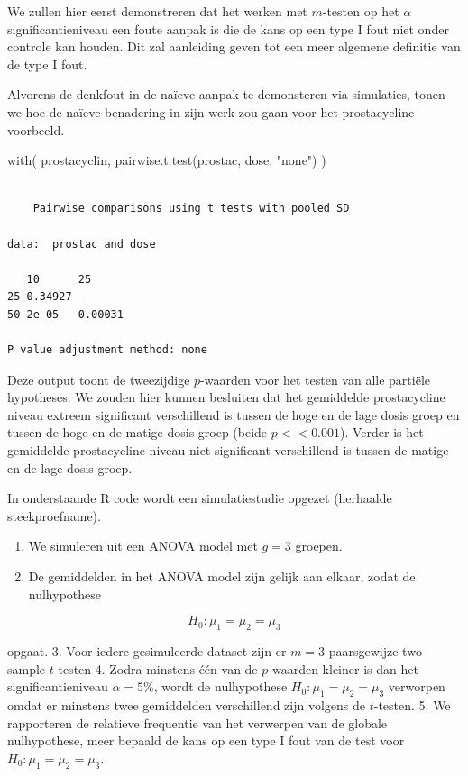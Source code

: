 \documentclass[
  dutch,
  letterpaper,
  12pt]{book}
\newenvironment{Shaded}{\begin{snugshade}}{\end{snugshade}}
\newcommand{\FunctionTok}[1]{\textcolor[rgb]{0.28,0.35,0.67}{#1}}
\newcommand{\NormalTok}[1]{\textcolor[rgb]{0.00,0.23,0.31}{#1}}
\newcommand{\StringTok}[1]{\textcolor[rgb]{0.13,0.47,0.30}{#1}}
\newcounter{none} %
\providecommand{\tightlist}{%
  \setlength{\itemsep}{0pt}\setlength{\parskip}{0pt}}
\theoremstyle{definition}
\theoremstyle{definition}
\theoremstyle{definition}
\theoremstyle{remark}
\begin{document}
We zullen hier eerst demonstreren dat het werken met \(m\)-testen op het
\(\alpha\) significantieniveau een foute aanpak is die de kans op een
type I fout niet onder controle kan houden. Dit zal aanleiding geven tot
een meer algemene definitie van de type I fout.

Alvorens de denkfout in de naïeve aanpak te demonsteren via simulaties,
tonen we hoe de naïeve benadering in zijn werk zou gaan voor het
prostacycline voorbeeld.

\begin{Shaded}
\begin{Highlighting}[]
\FunctionTok{with}\NormalTok{(}
\NormalTok{  prostacyclin,}
  \FunctionTok{pairwise.t.test}\NormalTok{(prostac, dose, }\StringTok{"none"}\NormalTok{)}
\NormalTok{  )}
\end{Highlighting}
\end{Shaded}

\begin{verbatim}

    Pairwise comparisons using t tests with pooled SD 

data:  prostac and dose 

   10      25     
25 0.34927 -      
50 2e-05   0.00031

P value adjustment method: none 
\end{verbatim}

Deze output toont de tweezijdige \(p\)-waarden voor het testen van alle
partiële hypotheses. We zouden hier kunnen besluiten dat het gemiddelde
prostacycline niveau extreem significant verschillend is tussen de hoge
en de lage dosis groep en tussen de hoge en de matige dosis groep (beide
\(p<<0.001\)). Verder is het gemiddelde prostacycline niveau niet
significant verschillend is tussen de matige en de lage dosis groep.

In onderstaande R code wordt een simulatiestudie opgezet (herhaalde
steekproefname).

\begin{enumerate}
\def\labelenumi{\arabic{enumi}.}
\tightlist
\item
  We simuleren uit een ANOVA model met \(g=3\) groepen.
\item
  De gemiddelden in het ANOVA model zijn gelijk aan elkaar, zodat de
  nulhypothese
\end{enumerate}

\[H_0: \mu_1=\mu_2=\mu_3\]

opgaat. 3. Voor iedere gesimuleerde dataset zijn er \(m=3\) paarsgewijze
two-sample \(t\)-testen 4. Zodra minstens één van de \(p\)-waarden
kleiner is dan het significantieniveau \(\alpha=5\%\), wordt de
nulhypothese \(H_0: \mu_1=\mu_2=\mu_3\) verworpen omdat er minstens twee
gemiddelden verschillend zijn volgens de \(t\)-testen. 5. We rapporteren
de relatieve frequentie van het verwerpen van de globale nulhypothese,
meer bepaald de kans op een type I fout van de test voor
\(H_0: \mu_1=\mu_2=\mu_3\).
\end{document}
